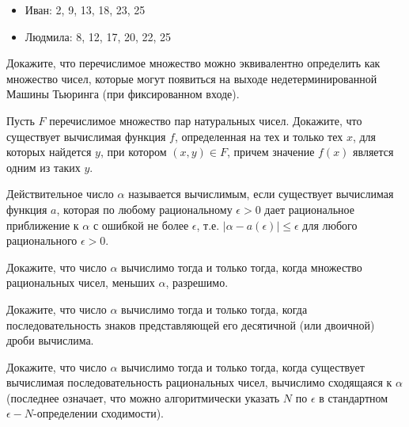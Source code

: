 \mytitle{}
\setcounter{curtask}{1}



\begin{itemize}
	\item Иван: 2, 9, 13, 18, 23, 25
	\item Людмила: 8, 12, 17, 20, 22, 25
\end{itemize}


\begin{task}
	Докажите, что перечислимое множество можно эквивалентно определить как множество чисел, которые могут появиться на выходе
    недетерминированной Машины Тьюринга (при фиксированном входе).
\end{task}


\begin{task}
	Пусть $F$ перечислимое множество пар натуральных чисел. Докажите, что существует вычислимая функция $f$, определенная на тех и
    только тех $x$, для которых найдется $y$, при котором $(x, y) \in F$, причем значение $f(x)$ является одним из таких $y$.
\end{task}

\begin{definition}
    Действительное число $\alpha$ называется вычислимым, если существует вычислимая функция $a$, которая по любому рациональному
    $\epsilon > 0$ дает рациональное приближение к $\alpha$ с ошибкой не более $\epsilon$, т.е. $|\alpha - a(\epsilon)| \le
    \epsilon$ для любого рационального $\epsilon > 0$.
\end{definition}


\begin{task}
    Докажите, что число $\alpha$ вычислимо тогда и только тогда, когда множество рациональных чисел, меньших $\alpha$, разрешимо.
\end{task}

\begin{task}
	Докажите, что число $\alpha$ вычислимо тогда и только тогда, когда последовательность знаков представляющей его десятичной
    (или двоичной) дроби вычислима.
\end{task}


\begin{task}
	Докажите, что число $\alpha$ вычислимо тогда и только тогда, когда существует вычислимая последовательность рациональных
    чисел, вычислимо сходящаяся к $\alpha$ (последнее означает, что можно алгоритмически указать $N$ по $\epsilon$ в стандартном
    $\epsilon-N$-определении сходимости).
\end{task}


